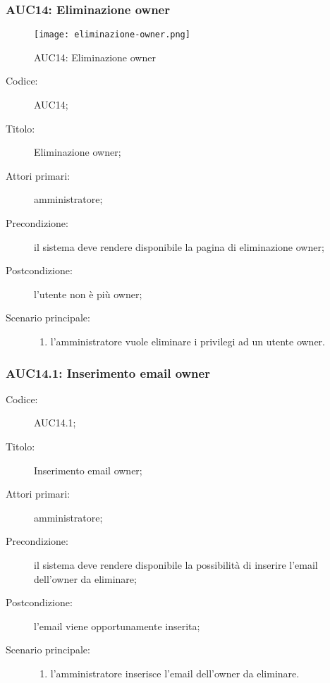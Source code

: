 \documentclass[../../../analisi-dei-requisiti.tex]{subfiles}
\begin{document}
\subsubsection{AUC14: Eliminazione owner}%
\label{subs:AUC14}

\begin{figure}[H]
  \centering
  \texttt{[image: eliminazione-owner.png]}
  \caption{AUC14: Eliminazione owner}%
  \label{fig:AUC14}
\end{figure}

\begin{description}
  \item[Codice:] AUC14;
  \item[Titolo:] Eliminazione owner;
  \item[Attori primari:] amministratore;
  \item[Precondizione:] il sistema deve rendere disponibile la pagina di eliminazione owner;
  \item[Postcondizione:] l'utente non è più owner;
  \item[Scenario principale:]
  \begin{enumerate}
    \item l'amministratore vuole eliminare i privilegi ad un utente owner.
  \end{enumerate}
\end{description}

\subsubsection{AUC14.1: Inserimento email owner}%
\label{subs:AUC14.1}
\begin{description}
  \item[Codice:] AUC14.1;
  \item[Titolo:] Inserimento email owner;
  \item[Attori primari:] amministratore;
  \item[Precondizione:] il sistema deve rendere disponibile la possibilità di inserire l'email dell'owner da eliminare;
  \item[Postcondizione:] l'email viene opportunamente inserita;
  \item[Scenario principale:]
  \begin{enumerate}
    \item l'amministratore inserisce l'email dell'owner da eliminare.
  \end{enumerate}
\end{description}
\end{document}
